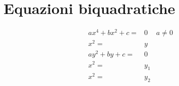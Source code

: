 \chapter{Equazioni biquadratiche}
\begin{align*}
ax^4+bx^2+c=&0&a\neq 0\\
x^2=&y\\
ay^2+by+c=&0\\
x^2=&y_1\\
x^2=&y_2
\end{align*}
